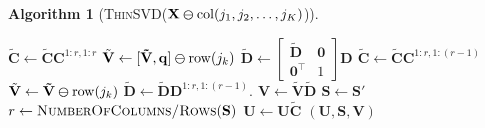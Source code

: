\documentclass[11pt,a4paper]{article}
\theoremstyle{break}
\newtheorem*{algorithm}{Algorithm}
\numberwithin{dummy}{section}
\theoremstyle{plain}
\theoremstyle{plain}
\theoremstyle{plain}
\theoremstyle{plain}
\theoremstyle{plain}
\theoremstyle{MyNonumberplain}
\newcommand{\0}{\M{0}}
\newcommand{\M}[1]{\mathbf{#1}}
\newcommand{\Mt}[1]{\tilde{\M{#1}}}
\newcommand{\T}{\top}
\newcommand{\ve}[1]{\mathbf{#1}}
\newcommand{\delcol}[2]{\M{#1} \varominus {\mathrm{col}}({#2})}
\newcommand{\delrow}[2]{\M{#1} \varominus \mathrm{row}(#2)}
\begin{document}
\begin{algorithm}[\textnormal{\textsc{ThinSVD}(\unboldmath$\delcol{X}{j_1,j_2, \dots, j_K}$)}]
\begin{algorithmic}[1]
    \If {$\ve{q} \neq \0$}
    \State
    \begin{math}
      \Mt{C}
      \gets
      \Mt{C}  \M{C}^{1:r, 1:r}
    \end{math}
    \State
    \begin{math}
      \Mt{V} \gets \delrow{[\Mt{V}, \ve{q}]}{j_k}
    \end{math}
    \State
    \begin{math}
      \Mt{D}
      \gets
      \begin{bmatrix}
        \Mt{D} & \0
        \\
        \0^\T & 1
      \end{bmatrix}
      \M{D}
    \end{math}
    \Else
    \State
    \begin{math}
      \Mt{C}
      \gets
      \Mt{C}  \M{C}^{1:r, 1:(r-1)}
    \end{math}
    \State
    \begin{math}
      \Mt{V}
      \gets
      \delrow{\Mt{V}}{j_k}
    \end{math}
    \State
    \begin{math}
      \Mt{D}
      \gets
      \Mt{D} \M{D}^{1:r, 1:(r-1)}.
    \end{math}
    \EndIf
    \State
    \begin{math}
      \M{V} \gets \Mt{V} \Mt{D}
    \end{math}
    \State
    \begin{math}
      \M{S} \gets \M{S}'
    \end{math}
    \State
    \begin{math}
      r \gets \textsc{NumberOfColumns/Rows}(\M{S})
    \end{math}
    \EndFor
   \State
    \begin{math}
      \M{U} \gets \M{U} \Mt{C}
    \end{math}
    \State
    \Return $(\M{U}, \M{S}, \M{V})$
  \end{algorithmic}
\end{algorithm}
\end{document}
